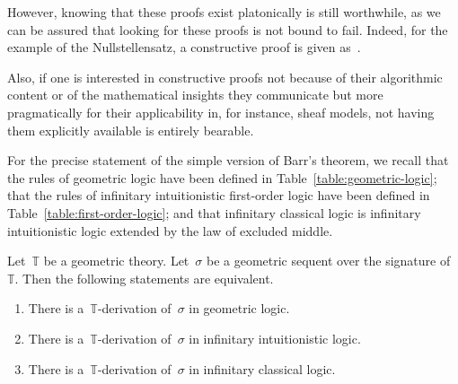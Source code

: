 \documentclass{ws-rv9x6}
\newcommand{\TT}{\mathbb{T}}
\renewcommand{\_}{\mathpunct{.}}
\newcommand{\?}{\,{:}\,}
\begin{document}
However, knowing that these proofs exist platonically is still worthwhile, as
we can be assured that looking for these proofs is not bound to fail. Indeed,
for the example of the Nullstellensatz, a constructive proof is given
as~\cite[Theorem~9.7]{lombardi-quitte:constructive-algebra}.

Also, if one is interested in constructive proofs not because of their
algorithmic content or of the mathematical insights they communicate but more
pragmatically for their applicability in, for instance, sheaf models, not
having them explicitly available is entirely bearable.

For the precise statement of the simple version of Barr's theorem, we recall
that the rules of geometric logic have been defined in
Table~\ref{table:geometric-logic}; that the rules of infinitary intuitionistic
first-order logic have been defined in Table~\ref{table:first-order-logic}; and
that infinitary classical logic is infinitary intuitionistic logic extended by
the law of excluded middle.
\begin{theorem}
\label{thm:baby-barr}
Let~$\TT$ be a geometric theory.
Let~$\sigma$ be a geometric sequent over the signature of~$\TT$. Then the
following statements are equivalent.
\begin{enumerate}
\item There is a~$\TT$-derivation of~$\sigma$ in geometric logic.
\item There is a~$\TT$-derivation of~$\sigma$ in infinitary intuitionistic
logic.
\item There is a~$\TT$-derivation of~$\sigma$ in infinitary classical logic.
\end{enumerate}
\end{theorem}
\end{document}
